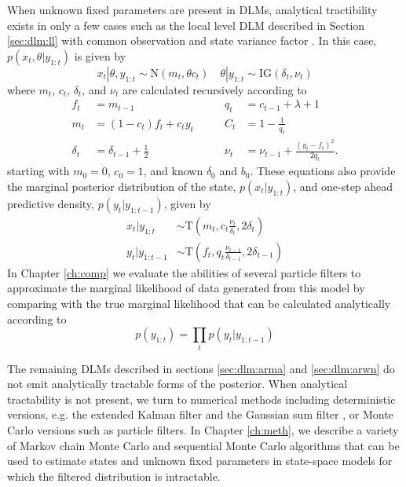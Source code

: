 When unknown fixed parameters are present in DLMs, analytical tractibility exists in only a few cases such as the local level DLM described in Section \ref{sec:dlm:ll} with common observation and state variance factor \cite[Sec 4.3][]{petris:camp:2009:dynamic}. In this case, $p(x_t,\theta|y_{1:t})$ is given by
\begin{equation}
x_t|\theta,y_{1:t} \sim \mbox{N}(m_t,\theta c_t) \quad \theta|y_{1:t} \sim \mbox{IG}(\delta_t, \nu_t) \label{eqn:ll:post}
\end{equation}
where $m_t$, $c_t$, $\delta_t$, and $\nu_t$ are calculated recursively according to
\begin{align}
f_t &= m_{t-1} &\qquad q_t &= c_{t-1} + \lambda + 1 \label{eqn:ll:kal} \\
m_t &= (1 - c_t)f_t + c_ty_t &\qquad C_t &= 1 - \frac{1}{q_t} \nonumber \\
\delta_t &= \delta_{t-1} + \frac{1}{2} &\qquad \nu_t &= \nu_{t-1} + \frac{(y_t-f_t)^2}{2q_t}. \nonumber
\end{align}
starting with $m_0 = 0$, $c_0 = 1$, and known $\delta_0$ and $b_0$. These equations also provide the marginal posterior distribution of the state, $p(x_t|y_{1:t})$, and one-step ahead predictive density, $p(y_t|y_{1:t-1})$, given by
\begin{align}
x_t|y_{1:t} &\sim \mbox{T}(m_t,c_t \frac{\nu_t}{\delta_t},2\delta_t) \label{eqn:ll:marg} \\
y_t|y_{1:t-1} &\sim \mbox{T}(f_t,q_t \frac{\nu_{t-1}}{\delta_{t-1}},2\delta_{t-1}) \label{eqn:ll:onestep}
\end{align}
In Chapter \ref{ch:comp} we evaluate the abilities of several particle filters to approximate the marginal likelihood of data generated from this model by comparing with the true marginal likelihood that can be calculated analytically according to
\begin{equation}
p(y_{1:t}) = \prod_t p(y_t|y_{1:t-1}) \label{eqn:ll:marglik}
\end{equation}

The remaining DLMs described in sections \ref{sec:dlm:arma} and \ref{sec:dlm:arwn} do not emit analytically tractable forms of the posterior. When analytical tractability is not present, we turn to numerical methods including deterministic versions, e.g. the extended Kalman filter \cite[Sec 1.6][]{hay:2001:kal} and the Gaussian sum filter \citep{Alsp:Sore:nonl:1972}, or Monte Carlo versions such as particle filters. In Chapter \ref{ch:meth}, we describe a variety of Markov chain Monte Carlo and sequential Monte Carlo algorithms that can be used to estimate states and unknown fixed parameters in state-space models for which the filtered distribution is intractable.